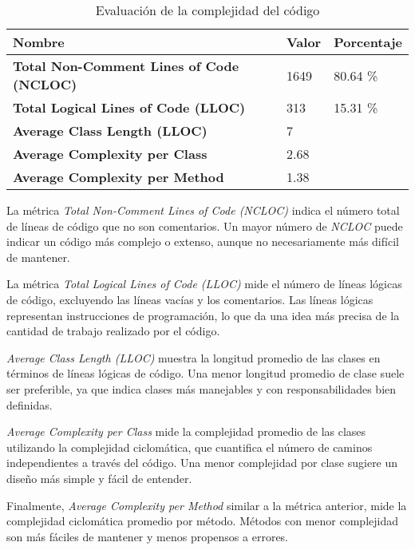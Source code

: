 \begin{table}[h]
    \renewcommand{\arraystretch}{1.5}
    \setlength{\tabcolsep}{10pt}
    \begin{tabular}{>{\bfseries}p{} p{} p{}}
        \toprule
        \textbf{Nombre}                         & \textbf{Valor} & \textbf{Porcentaje} \\
        \midrule
        Total Non-Comment Lines of Code (NCLOC) & 1649           & 80.64 \%            \\
        Total Logical Lines of Code (LLOC)      & 313            & 15.31 \%            \\
        Average Class Length (LLOC)             & 7              &                     \\
        Average Complexity per Class            & 2.68           &                     \\
        Average Complexity per Method           & 1.38           &                     \\
        \bottomrule
    \end{tabular}
    \caption{Evaluación de la complejidad del código}
    \label{tab:phploc_report}
\end{table}

La métrica \textit{Total Non-Comment Lines of Code (NCLOC)} indica el número total de líneas de código que no son
comentarios.
Un mayor número de \textit{NCLOC} puede indicar un código más complejo o extenso, aunque no necesariamente más difícil
de mantener.

La métrica \textit{Total Logical Lines of Code (LLOC)} mide el número de líneas lógicas de código, excluyendo las
líneas vacías y los comentarios.
Las líneas lógicas representan instrucciones de programación, lo que da una idea más precisa de la cantidad de trabajo
realizado por el código.

\textit{Average Class Length (LLOC)} muestra la longitud promedio de las clases en términos de líneas lógicas de código.
Una menor longitud promedio de clase suele ser preferible, ya que indica clases más manejables y con responsabilidades
bien definidas.

\textit{Average Complexity per Class} mide la complejidad promedio de las clases utilizando la complejidad ciclomática,
que cuantifica el número de caminos independientes a través del código.
Una menor complejidad por clase sugiere un diseño más simple y fácil de entender.

Finalmente, \textit{Average Complexity per Method} similar a la métrica anterior, mide la complejidad ciclomática
promedio por método.
Métodos con menor complejidad son más fáciles de mantener y menos propensos a errores.

